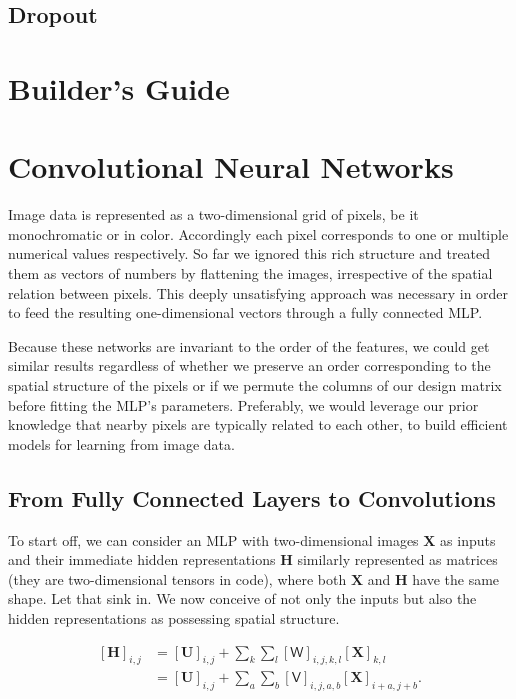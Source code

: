 \documentclass[a4paper,12pt]{article}
\theoremstyle{definition}
\begin{document}
\subsection*{Dropout}

\section{Builder's Guide}

\section{Convolutional Neural Networks}
Image data is represented as a two-dimensional grid of pixels, be it monochromatic or in color. Accordingly each pixel corresponds to one or multiple numerical values
respectively. So far we ignored this rich structure and treated them as vectors of numbers by flattening the images, irrespective of the spatial relation between pixels.
This deeply unsatisfying approach was necessary in order to feed the resulting one-dimensional vectors through a fully connected MLP.

Because these networks are invariant to the order of the features, we could get similar results regardless of whether we preserve an order corresponding to the spatial
structure of the pixels or if we permute the columns of our design matrix before fitting the MLP’s parameters. Preferably, we would leverage our prior knowledge that
nearby pixels are typically related to each other, to build efficient models for learning from image data.
\subsection{From Fully Connected Layers to Convolutions}

To start off, we can consider an MLP with two-dimensional images $\mathbf{X}$ as inputs and their immediate hidden representations $\mathbf{H}$  similarly represented
as matrices (they are two-dimensional tensors in code), where both $\mathbf{X}$ and $\mathbf{H}$ have the same shape. Let that sink in. We now conceive of not only the
inputs but also the hidden representations as possessing spatial structure.


\begin{equation*}
    \begin{aligned}
        [\mathbf{H}]_{i, j} & = [\mathbf{U}]_{i, j} + \sum_k \sum_l[\mathsf{W}]_{i, j, k, l}  [\mathbf{X}]_{k, l} \\ &=  [\mathbf{U}]_{i, j} +
        \sum_a \sum_b [\mathsf{V}]_{i, j, a, b}  [\mathbf{X}]_{i+a, j+b}.
    \end{aligned}
\end{equation*}
\end{document}
